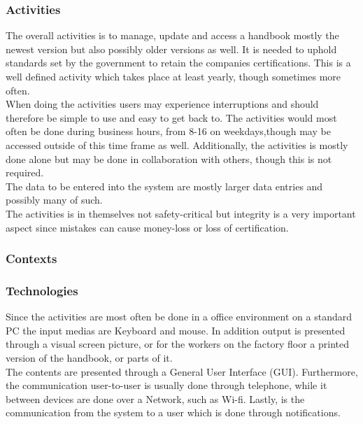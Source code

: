 \subsubsection*{Activities}
The overall activities is to manage, update and access a handbook mostly the newest version but also possibly older versions as well.
It is needed to uphold standards set by the government to retain the companies certifications.
This is a well defined activity which takes place at least yearly, though sometimes more often.
\\\indent
When doing the activities users may experience interruptions and should therefore be simple to use and easy to get back to.
The activities would most often be done during business hours, from 8-16 on weekdays,though may be accessed outside of this time frame as well.
Additionally, the activities is mostly done alone but may be done in collaboration with others, though this is not required.
\\\indent
The data to be entered into the system are mostly larger data entries and possibly many of such.
\\\indent
The activities is in themselves not safety-critical but integrity is a very important aspect since mistakes can cause money-loss or loss of certification.

\subsubsection*{Contexts}




\subsubsection*{Technologies}
Since the activities are most often be done in a office environment on a standard PC the input medias are Keyboard and mouse.
In addition output is presented through a visual screen picture, or for the workers on the factory floor a printed version of the handbook, or parts of it.
\\\indent
The contents are presented through a General User Interface (GUI).
Furthermore, the communication user-to-user is usually done through telephone, while it between devices are done over a Network, such as Wi-fi.
Lastly, is the communication from the system to a user which is done through notifications.

